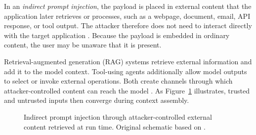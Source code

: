 In an \emph{indirect prompt injection}, the payload is placed in external
content that the application later retrieves or processes, such as a webpage,
document, email, API response, or tool output. The attacker therefore does not
need to interact directly with the target application
\parencite{greshake2023indirect}. Because the payload is embedded in ordinary
content, the user may be unaware that it is present.

Retrieval-augmented generation (RAG) systems retrieve external information and
add it to the model context. Tool-using agents additionally allow model outputs
to select or invoke external operations. Both create channels through which
attacker-controlled content can reach the model
\parencites{greshake2023indirect}{debenedetti2024agentdojo}. As
Figure~\ref{fig:indirect-prompt-injection} illustrates, trusted and untrusted
inputs then converge during context assembly.

\begin{figure}[H]
    \centering
    \caption[Indirect prompt injection]{Indirect prompt injection through
    attacker-controlled external content retrieved at run time. Original
    schematic based on
    \textcite{greshake2023indirect}.}
    \label{fig:indirect-prompt-injection}
\end{figure}

